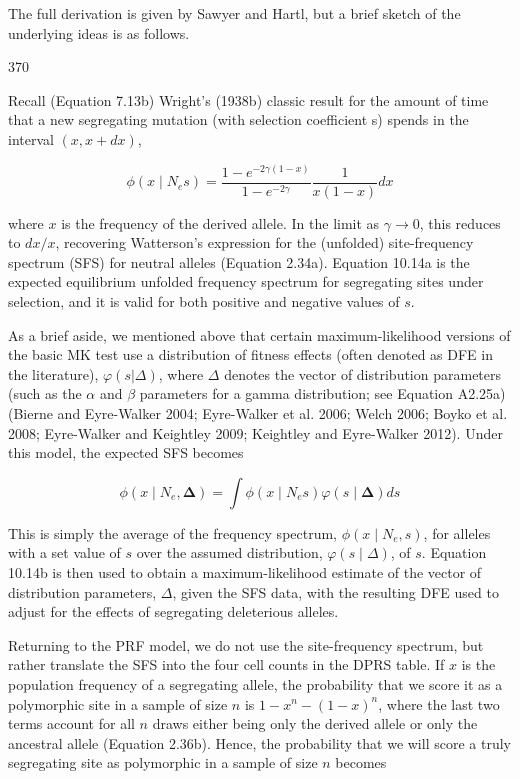 \documentclass{article}
\begin{document}
The full derivation is given by Sawyer and Hartl, but a brief sketch of the underlying ideas is as follows.

370

Recall (Equation 7.13b) Wright’s (1938b) classic result for the amount of time that a new segregating mutation (with selection coefficient s) spends in the interval  $ (x, x + dx) $,

\begin{equation}
\phi(x\mid N_{e}s)=\frac{1-e^{-2\gamma(1-x)}}{1-e^{-2\gamma}}\frac{1}{x(1-x)}dx
\tag{10.14a}
\label{eq:10_14a}
\end{equation}

where $x$ is the frequency of the derived allele. In the limit as $\gamma \to 0$, this reduces to $dx/x$, recovering Watterson's expression for the (unfolded) site-frequency spectrum (SFS) for neutral alleles (Equation 2.34a). Equation 10.14a is the expected equilibrium unfolded frequency spectrum for segregating sites under selection, and it is valid for both positive and negative values of $s$.

As a brief aside, we mentioned above that certain maximum-likelihood versions of the basic MK test use a distribution of fitness effects (often denoted as DFE in the literature),  $ \varphi(s|\Delta) $, where  $ \Delta $ denotes the vector of distribution parameters (such as the  $ \alpha $ and  $ \beta $ parameters for a gamma distribution; see Equation A2.25a) (Bierne and Eyre-Walker 2004; Eyre-Walker et al. 2006; Welch 2006; Boyko et al. 2008; Eyre-Walker and Keightley 2009; Keightley and Eyre-Walker 2012). Under this model, the expected SFS becomes

\begin{equation}
\phi(x\mid N_{e},\boldsymbol{\Delta})=\int\phi(x\mid N_{e}s)\varphi(s\mid\boldsymbol{\Delta})ds
\tag{10.14b}
\label{eq:10_14b}
\end{equation}

This is simply the average of the frequency spectrum,  $ \phi(x \mid N_e, s) $, for alleles with a set value of  $ s $ over the assumed distribution,  $ \varphi(s \mid \Delta) $, of  $ s $. Equation 10.14b is then used to obtain a maximum-likelihood estimate of the vector of distribution parameters,  $ \Delta $, given the SFS data, with the resulting DFE used to adjust for the effects of segregating deleterious alleles.

Returning to the PRF model, we do not use the site-frequency spectrum, but rather translate the SFS into the four cell counts in the DPRS table. If  $ x $ is the population frequency of a segregating allele, the probability that we score it as a polymorphic site in a sample of size  $ n $ is  $ 1 - x^n - (1 - x)^n $, where the last two terms account for all  $ n $ draws either being only the derived allele or only the ancestral allele (Equation 2.36b). Hence, the probability that we will score a truly segregating site as polymorphic in a sample of size  $ n $ becomes
\end{document}
